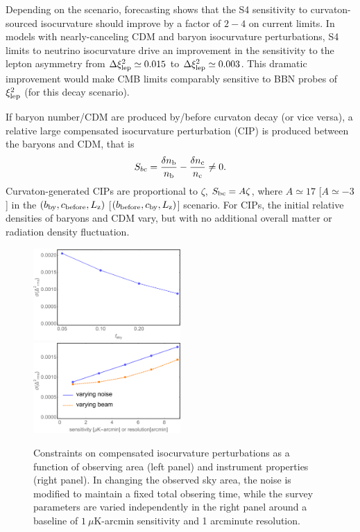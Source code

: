 Depending on the scenario, forecasting shows that the S4 sensitivity to curvaton-sourced isocurvature should improve by a factor of $2-4$ on current limits. In models with nearly-canceling CDM and baryon isocurvature perturbations, S4 limits to neutrino isocurvature drive an improvement in the sensitivity to the lepton asymmetry from $\Delta \xi_{\rm lep}^{2}\simeq 0.015$ to $\Delta \xi_{\rm lep}^{2}\simeq 0.003$. This dramatic improvement would make CMB limits comparably sensitive to BBN probes of $\xi_{\rm lep}^{2}$ (for this decay scenario).

If baryon number/CDM are produced by/before curvaton decay (or vice versa), a relative large compensated isocurvature perturbation (CIP) is produced between the baryons and CDM, that is
\begin{equation}
S_{bc}=\frac{\delta n_{\rm b}}{n_{\rm b}}-\frac{\delta n_{\rm c}}{n_{\rm c}}\neq 0.
\end{equation} Curvaton-generated CIPs are proportional to $\zeta$, $S_{\rm bc}=A\zeta$, where $A\simeq 17$ [$A\simeq -3$] in the $(b_{\rm by}, c_{\rm before}, L_{\rm z})$ [$(b_{\rm before}, c_{\rm by}, L_{\rm z})$] scenario. For CIPs, the initial relative densities of baryons and CDM vary, but with no additional overall matter or radiation density fluctuation.

\begin{figure}[htbp!]
\includegraphics[width=0.5\textwidth]{Inflation/S4CIPsfsky.pdf}
 \includegraphics[width=0.5\textwidth]{Inflation/S4CIPsNoise.pdf}
 \caption{Constraints on compensated isocurvature perturbations as a function of observing area (left panel) and instrument properties (right panel). In changing the observed sky area, the noise is modified to maintain a fixed total obsering time, while the survey parameters are varied independently in the right panel around a baseline of $1~\mu$K-arcmin sensitivity and 1 arcminute resolution.
\label{fig:CIPs_kovetz}}
\end{figure} 

